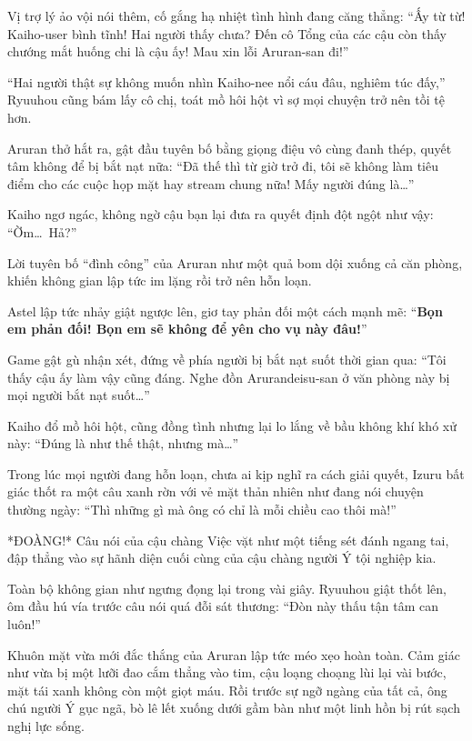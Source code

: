 \documentclass[../main.tex]{subfiles}
\begin{document}
Vị trợ lý ảo vội nói thêm, cố gắng hạ nhiệt tình hình đang căng thẳng: ``Ấy từ từ! Kaiho-user bình tĩnh! Hai người thấy chưa? Đến cô Tổng của các cậu còn thấy chướng mắt huống chi là cậu ấy! Mau xin lỗi Aruran-san đi!''

``Hai người thật sự không muốn nhìn Kaiho-nee nổi cáu đâu, nghiêm túc đấy,'' Ryuuhou cũng bám lấy cô chị, toát mồ hôi hột vì sợ mọi chuyện trở nên tồi tệ hơn.

Aruran thở hắt ra, gật đầu tuyên bố bằng giọng điệu vô cùng đanh thép, quyết tâm không để bị bắt nạt nữa: ``Đã thế thì từ giờ trở đi, tôi sẽ không làm tiêu điểm cho các cuộc họp mặt hay stream chung nữa! Mấy người đúng là\dots''

Kaiho ngơ ngác, không ngờ cậu bạn lại đưa ra quyết định đột ngột như vậy: ``Ờm\dots\ Hả?''

Lời tuyên bố ``đình công'' của Aruran như một quả bom dội xuống cả căn phòng, khiến không gian lập tức im lặng rồi trở nên hỗn loạn.

Astel lập tức nhảy giật ngược lên, giơ tay phản đối một cách mạnh mẽ: ``\textbf{Bọn em phản đối! Bọn em sẽ không để yên cho vụ này đâu!}''


Game gật gù nhận xét, đứng về phía người bị bắt nạt suốt thời gian qua: ``Tôi thấy cậu ấy làm vậy cũng đáng. Nghe đồn Arurandeisu-san ở văn phòng này bị mọi người bắt nạt suốt\dots''

Kaiho đổ mồ hôi hột, cũng đồng tình nhưng lại lo lắng về bầu không khí khó xử này: ``Đúng là như thế thật, nhưng mà\dots''

Trong lúc mọi người đang hỗn loạn, chưa ai kịp nghĩ ra cách giải quyết, Izuru bất giác thốt ra một câu xanh rờn với vẻ mặt thản nhiên như đang nói chuyện thường ngày: ``Thì những gì mà ông có chỉ là mỗi chiều cao thôi mà!''

*ĐOÀNG!* Câu nói của cậu chàng Việc vặt như một tiếng sét đánh ngang tai, đập thẳng vào sự hãnh diện cuối cùng của cậu chàng người Ý tội nghiệp kia.


Toàn bộ không gian như ngưng đọng lại trong vài giây. Ryuuhou giật thốt lên, ôm đầu hú vía trước câu nói quá đỗi sát thương: ``Đòn này thấu tận tâm can luôn!''

Khuôn mặt vừa mới đắc thắng của Aruran lập tức méo xẹo hoàn toàn. Cảm giác như vừa bị một lưỡi đao cắm thẳng vào tim, cậu loạng choạng lùi lại vài bước, mặt tái xanh không còn một giọt máu. Rồi trước sự ngỡ ngàng của tất cả, ông chú người Ý gục ngã, bò lê lết xuống dưới gầm bàn như một linh hồn bị rút sạch nghị lực sống.
\end{document}
